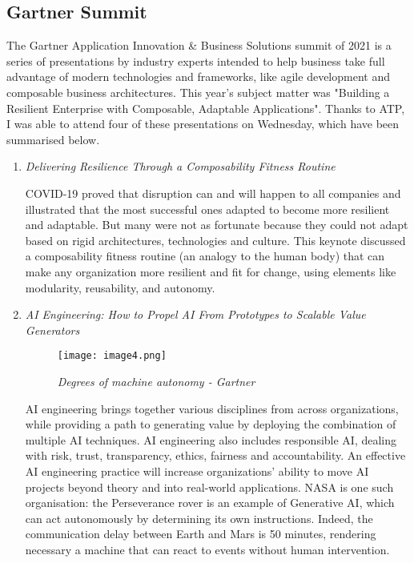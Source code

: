 \subsection{Gartner Summit}

The Gartner Application Innovation \& Business Solutions summit of 2021 is a
series of presentations by industry experts intended to help business take full
advantage of modern technologies and frameworks, like agile development and
composable business architectures. This year's subject matter was "Building a
Resilient Enterprise with Composable, Adaptable Applications". Thanks to ATP, I
was able to attend four of these presentations on Wednesday, which have been
summarised below.

\begin{enumerate}
    \item \color{dgreen} \textit{Delivering Resilience Through a Composability
          Fitness Routine}

    \color{black}COVID-19 proved that disruption can and will happen to all
    companies and illustrated that the most successful ones adapted to become
    more resilient and adaptable. But many were not as fortunate because they
    could not adapt based on rigid architectures, technologies and culture. This
    keynote discussed a composability fitness routine (an analogy to the human
    body) that can make any organization more resilient and fit for change,
    using elements like modularity, reusability, and autonomy.

    \item \color{dgreen} \textit{AI Engineering: How to Propel AI From
          Prototypes to Scalable Value Generators}

    \begin{figure}[H]
        \centering
            \texttt{[image: image4.png]}
            \caption*{\textit{Degrees of machine autonomy - Gartner}}
    \end{figure}

    \color{black} AI engineering brings together various disciplines from across
    organizations, while providing a path to generating value by deploying the
    combination of multiple AI techniques. AI engineering also includes
    responsible AI, dealing with risk, trust, transparency, ethics, fairness and
    accountability. An effective AI engineering practice will increase
    organizations’ ability to move AI projects beyond theory and into real-world
    applications. NASA is one such organisation: the Perseverance rover is an
    example of Generative AI, which can act  autonomously by determining its own
    instructions. Indeed, the communication delay between Earth and Mars is 50
    minutes, rendering necessary a machine that can react to events without
    human intervention.


\end{enumerate}
